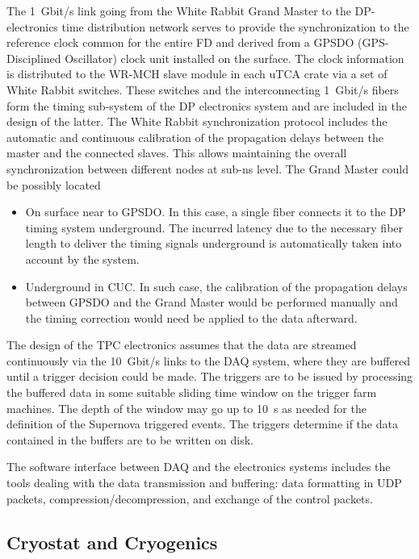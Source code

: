 The \SI{1}{Gbit/s} link going from the White Rabbit Grand Master to the DP-electronics time distribution network serves to provide the synchronization to the reference clock common for the entire FD and derived from a GPSDO (GPS-Disciplined Oscillator) clock unit installed on the surface. The clock information is distributed to the WR-MCH slave module in each uTCA crate via a set of White Rabbit switches. These switches and the interconnecting \SI{1}{Gbit/s} fibers form the timing sub-system of the DP electronics system and are included in the design of the latter. The White Rabbit synchronization protocol includes the automatic and continuous calibration of the propagation delays between the master and the connected slaves. This allows maintaining the overall synchronization between different nodes at sub-ns level. The Grand Master could be possibly located 
\begin{itemize}
\item{On surface near to GPSDO. In this case, a single fiber connects it to the DP timing system underground. The incurred latency due to the necessary fiber length to deliver the timing signals underground is automatically taken into account by the system. }
\item{Underground in CUC. In such case, the calibration of the propagation delays between GPSDO and the Grand Master would be performed manually and the timing correction would need be applied to the data afterward.}
\end{itemize} 

The design of the TPC electronics assumes that the data are streamed continuously via the \SI{10}{Gbit/s} links to the DAQ system, where they are buffered until a trigger decision could be made. The triggers are to be issued by processing the buffered data in some suitable sliding time window on the trigger farm machines. The depth of the window may go up to \SI{10}{s} as needed for the definition of the Supernova triggered events. The triggers determine if the data contained in the buffers are to be written on disk. 

The software interface between DAQ and the electronics systems includes the tools dealing with the data transmission and buffering: data formatting in UDP packets, compression/decompression, and exchange of the control packets.

\subsection{Cryostat and Cryogenics}
\label{sec:fddp-tpc-elec-intfc-cryo}

